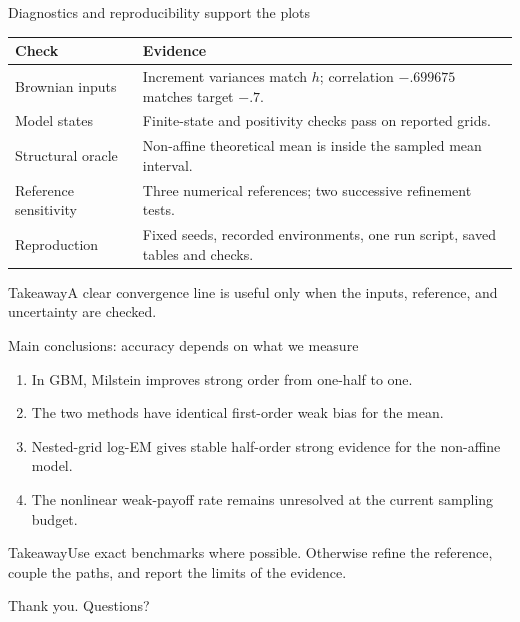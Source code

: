 \documentclass[aspectratio=169,10pt]{beamer}
\newcommand{\takeaway}[1]{\begin{block}{Takeaway}\small #1\end{block}}
\begin{document}
\begin{frame}{Diagnostics and reproducibility support the plots}
  \begin{tabular}{p{}p{}}
    \toprule
    Check & Evidence \\
    \midrule
    Brownian inputs & Increment variances match $h$; correlation $-.699675$ matches target $-.7$.\\
    Model states & Finite-state and positivity checks pass on reported grids.\\
    Structural oracle & Non-affine theoretical mean is inside the sampled mean interval.\\
    Reference sensitivity & Three numerical references; two successive refinement tests.\\
    Reproduction & Fixed seeds, recorded environments, one run script, saved tables and checks.\\
    \bottomrule
  \end{tabular}
  \takeaway{A clear convergence line is useful only when the inputs, reference, and uncertainty are checked.}
\end{frame}

\begin{frame}{Main conclusions: accuracy depends on what we measure}
  \begin{enumerate}
    \item In GBM, Milstein improves strong order from one-half to one.
    \item The two methods have identical first-order weak bias for the mean.
    \item Nested-grid log-EM gives stable half-order strong evidence for the non-affine model.
    \item The nonlinear weak-payoff rate remains unresolved at the current sampling budget.
  \end{enumerate}
  \vspace{.7em}
  \takeaway{Use exact benchmarks where possible. Otherwise refine the reference, couple the paths, and report the limits of the evidence.}
  \centering\small Thank you. Questions?
\end{frame}
\end{document}
